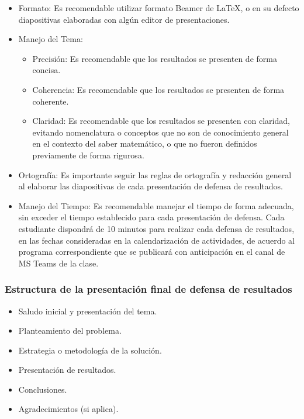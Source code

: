 \documentclass[peerreview]{IEEEtran}
\begin{document}
\begin{itemize}
\item Formato: Es recomendable utilizar formato Beamer de \LaTeX, o en su defecto diapositivas elaboradas con alg\'un editor de presentaciones.

\item Manejo del Tema:

\begin{itemize}
\item Precisi\'on: Es recomendable que los resultados se presenten de forma concisa.

\item Coherencia: Es recomendable que los resultados se presenten de forma coherente.

\item Claridad: Es recomendable que los resultados se presenten con claridad, evitando nomenclatura o conceptos que no son de conocimiento general en el contexto del saber matem\'atico, o que no fueron definidos previamente de forma rigurosa.
\end{itemize}


\item Ortograf\'ia: Es importante seguir las reglas de ortograf\'ia y redacci\'on general al elaborar las diapositivas de cada presentaci\'on de defensa de resultados.

\item Manejo del Tiempo: Es recomendable manejar el tiempo de forma adecuada, sin exceder el tiempo establecido para cada presentaci\'on de defensa. Cada estudiante dispondr\'a de 10 minutos para realizar cada defensa de resultados, en las fechas consideradas en la calendarizaci\'on de actividades, de acuerdo al programa correspondiente que se publicar\'a con anticipaci\'on en el canal de MS Teams de la clase.

\end{itemize}

\subsubsection{Estructura de la presentaci\'on final de defensa de resultados}

\begin{itemize}
\item Saludo inicial y presentaci\'on del tema.
\item Planteamiento del problema.
\item Estrategia o metodolog\'ia de la soluci\'on.
\item Presentaci\'on de resultados.
\item Conclusiones.
\item Agradecimientos (si aplica).
\end{itemize}
\end{document}

